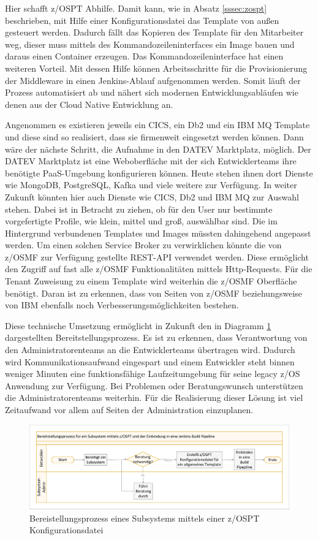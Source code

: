 Hier schafft z/OSPT Abhilfe.
Damit kann, wie in Absatz \ref{sssec:zospt} beschrieben, mit Hilfe einer Konfigurationsdatei das Template von außen gesteuert werden.
Dadurch fällt das Kopieren des Template für den Mitarbeiter weg, dieser muss mittels des Kommandozeileninterfaces ein Image bauen und daraus einen Container erzeugen.
Das Kommandozeileninterface hat einen weiteren Vorteil.
Mit dessen Hilfe können Arbeitsschritte für die Provisionierung der Middleware in einen Jenkins-Ablauf aufgenommen werden.
Somit läuft der Prozess automatisiert ab und nähert sich modernen Entwicklungsabläufen wie denen aus der Cloud Native Entwicklung an.

Angenommen es existieren jeweils ein CICS, ein Db2 und ein IBM MQ Template und diese sind so realisiert, dass sie firmenweit eingesetzt werden können.
Dann wäre der nächste Schritt, die Aufnahme in den \glqq DATEV Marktplatz\grqq, möglich.
Der \glqq DATEV Marktplatz\grqq{} ist eine Weboberfläche mit der sich Entwicklerteams ihre benötigte PaaS-Umgebung konfigurieren können.
Heute stehen ihnen dort Dienste wie MongoDB, PostgreSQL, Kafka und viele weitere zur Verfügung.
In weiter Zukunft könnten hier auch Dienste wie CICS, Db2 und IBM MQ zur Auswahl stehen.
Dabei ist in Betracht zu ziehen, ob für den User nur bestimmte vorgefertigte Profile, wie \glqq klein\grqq, \glqq mittel\grqq{} und \glqq groß\grqq, auswählbar sind.
Die im Hintergrund verbundenen Templates und Images müssten dahingehend angepasst werden.
Um einen solchen \glqq Service Broker\grqq{} zu verwirklichen könnte die von z/OSMF zur Verfügung gestellte REST-API verwendet werden.
Diese ermöglicht den Zugriff auf fast alle z/OSMF Funktionalitäten mittels Http-Requests.
Für die \glqq Tenant\grqq{} Zuweisung zu einem Template wird weiterhin die z/OSMF Oberfläche benötigt.
Daran ist zu erkennen, dass von Seiten von z/OSMF beziehungsweise von IBM ebenfalls noch Verbesserungsmöglichkeiten bestehen.

Diese technische Umsetzung ermöglicht in Zukunft den in Diagramm \ref{fig:proneu} dargestellten Bereitstellungsprozess.
Es ist zu erkennen, dass Verantwortung von den Administratorenteams an die Entwicklerteams übertragen wird.
Dadurch wird Kommunikationsaufwand eingespart und einem Entwickler steht binnen weniger Minuten eine funktionsfähige Laufzeitumgebung für seine legacy z/OS Anwendung zur Verfügung.
Bei Problemen oder Beratungswunsch unterstützen die Administratorenteams weiterhin.
Für die Realisierung dieser Lösung ist viel Zeitaufwand vor allem auf Seiten der Administration einzuplanen.

\begin{figure}[ht!]
\centering
\includegraphics[width=\paperwidth,angle=90]{figures/swimlaneNeuerProzess.pdf}
\caption{Bereistellungsprozess eines Subsystems mittels einer z/OSPT Konfigurationsdatei}
\label{fig:proneu}
\end{figure}


